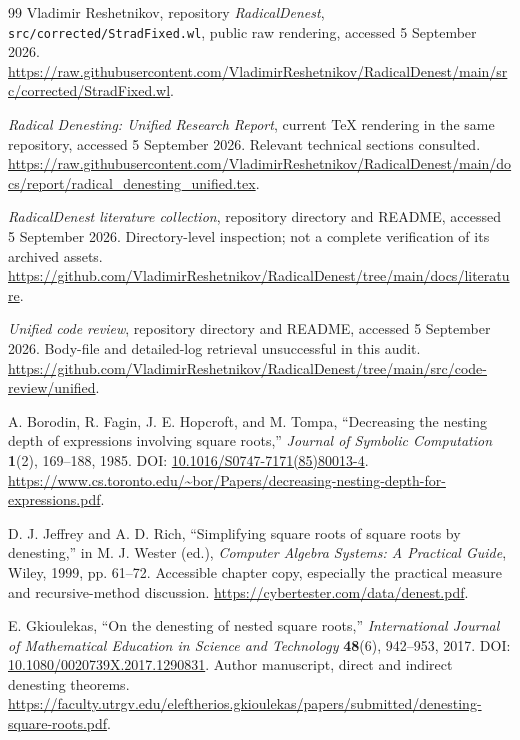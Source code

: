 \documentclass[11pt,letterpaper]{article}
\newcommand{\code}[1]{\texttt{#1}}
\theoremstyle{definition}
\begin{document}
\begin{thebibliography}{99}
\small
{} Vladimir Reshetnikov, repository \emph{RadicalDenest}, \code{src/corrected/StradFixed.wl}, public raw rendering, accessed 5 September 2026.\newline
\url{https://raw.githubusercontent.com/VladimirReshetnikov/RadicalDenest/main/src/corrected/StradFixed.wl}.

 \emph{Radical Denesting: Unified Research Report}, current TeX rendering in the same repository, accessed 5 September 2026. Relevant technical sections consulted.\newline
\url{https://raw.githubusercontent.com/VladimirReshetnikov/RadicalDenest/main/docs/report/radical_denesting_unified.tex}.

 \emph{RadicalDenest literature collection}, repository directory and README, accessed 5 September 2026. Directory-level inspection; not a complete verification of its archived assets.\newline
\url{https://github.com/VladimirReshetnikov/RadicalDenest/tree/main/docs/literature}.

 \emph{Unified code review}, repository directory and README, accessed 5 September 2026. Body-file and detailed-log retrieval unsuccessful in this audit.\newline
\url{https://github.com/VladimirReshetnikov/RadicalDenest/tree/main/src/code-review/unified}.

 A. Borodin, R. Fagin, J. E. Hopcroft, and M. Tompa, ``Decreasing the nesting depth of expressions involving square roots,'' \emph{Journal of Symbolic Computation} \textbf{1}(2), 169--188, 1985. DOI: \href{https://doi.org/10.1016/S0747-7171(85)80013-4}{10.1016/S0747-7171(85)80013-4}.\newline
\url{https://www.cs.toronto.edu/~bor/Papers/decreasing-nesting-depth-for-expressions.pdf}.

 D. J. Jeffrey and A. D. Rich, ``Simplifying square roots of square roots by denesting,'' in M. J. Wester (ed.), \emph{Computer Algebra Systems: A Practical Guide}, Wiley, 1999, pp. 61--72. Accessible chapter copy, especially the practical measure and recursive-method discussion.\newline
\url{https://cybertester.com/data/denest.pdf}.

 E. Gkioulekas, ``On the denesting of nested square roots,'' \emph{International Journal of Mathematical Education in Science and Technology} \textbf{48}(6), 942--953, 2017. DOI: \href{https://doi.org/10.1080/0020739X.2017.1290831}{10.1080/0020739X.2017.1290831}. Author manuscript, direct and indirect denesting theorems.\newline
\url{https://faculty.utrgv.edu/eleftherios.gkioulekas/papers/submitted/denesting-square-roots.pdf}.


\end{thebibliography}
\end{document}
